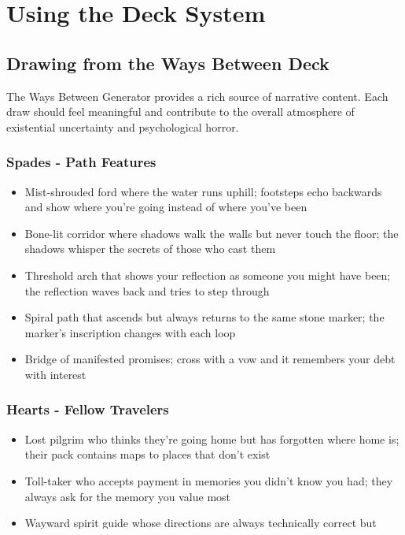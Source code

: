 \documentclass[11pt]{article}
\begin{document}
\section{Using the Deck System}

\subsection{Drawing from the Ways Between Deck}

The Ways Between Generator provides a rich source of narrative content. Each draw should feel meaningful and contribute to the overall atmosphere of existential uncertainty and psychological horror.

\subsubsection{Spades - Path Features}

\begin{itemize}
\item Mist-shrouded ford where the water runs uphill; footsteps echo backwards and show where you're going instead of where you've been
\item Bone-lit corridor where shadows walk the walls but never touch the floor; the shadows whisper the secrets of those who cast them
\item Threshold arch that shows your reflection as someone you might have been; the reflection waves back and tries to step through
\item Spiral path that ascends but always returns to the same stone marker; the marker's inscription changes with each loop
\item Bridge of manifested promises; cross with a vow and it remembers your debt with interest
\end{itemize}

\subsubsection{Hearts - Fellow Travelers}

\begin{itemize}
\item Lost pilgrim who thinks they're going home but has forgotten where home is; their pack contains maps to places that don't exist
\item Toll-taker who accepts payment in memories you didn't know you had; they always ask for the memory you value most
\item Wayward spirit guide whose directions are always technically correct but morally questionable; they speak in riddles that make perfect sense until you've already followed them
\item Dream-merchant carrying a sack of nightmares and one perfect dream for sale; the perfect dream costs more than you can imagine
\end{itemize}
\end{document}
